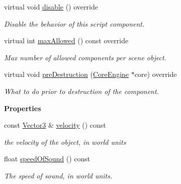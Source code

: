 \begin{Indent}
\begin{DoxyCompactItemize}
virtual void \mbox{\hyperlink{classrev_1_1_audio_listener_component_a3809571f948758cb566a3c34f3523009}{disable}} () override
\begin{DoxyCompactList}\small\item\em Disable the behavior of this script component. \end{DoxyCompactList}\item 
\mbox{\label{classrev_1_1_audio_listener_component_afb4f9251d5de8ff5e320aec4aa68bc57}} 
virtual int \mbox{\hyperlink{classrev_1_1_audio_listener_component_afb4f9251d5de8ff5e320aec4aa68bc57}{max\+Allowed}} () const override
\begin{DoxyCompactList}\small\item\em Max number of allowed components per scene object. \end{DoxyCompactList}\item 
\mbox{\label{classrev_1_1_audio_listener_component_a5b4919733772856c7fe2b8184b57fb52}} 
virtual void \mbox{\hyperlink{classrev_1_1_audio_listener_component_a5b4919733772856c7fe2b8184b57fb52}{pre\+Destruction}} (\mbox{\hyperlink{classrev_1_1_core_engine}{Core\+Engine}} $\ast$core) override
\begin{DoxyCompactList}\small\item\em What to do prior to destruction of the component. \end{DoxyCompactList}\end{DoxyCompactItemize}
\end{Indent}
\begin{Indent}\textbf{ Properties}\par
\begin{DoxyCompactItemize}
\item 
\mbox{\label{classrev_1_1_audio_listener_component_a8f590b05fd17edbeb83494b5e7458f7f}} 
const \mbox{\hyperlink{classrev_1_1_vector}{Vector3}} \& \mbox{\hyperlink{classrev_1_1_audio_listener_component_a8f590b05fd17edbeb83494b5e7458f7f}{velocity}} () const
\begin{DoxyCompactList}\small\item\em the velocity of the object, in world units \end{DoxyCompactList}\item 
\mbox{\label{classrev_1_1_audio_listener_component_a90355885465613387f9befdc24834939}} 
float \mbox{\hyperlink{classrev_1_1_audio_listener_component_a90355885465613387f9befdc24834939}{speed\+Of\+Sound}} () const
\begin{DoxyCompactList}\small\item\em The speed of sound, in world units. \end{DoxyCompactList}\end{DoxyCompactItemize}
\end{Indent}
